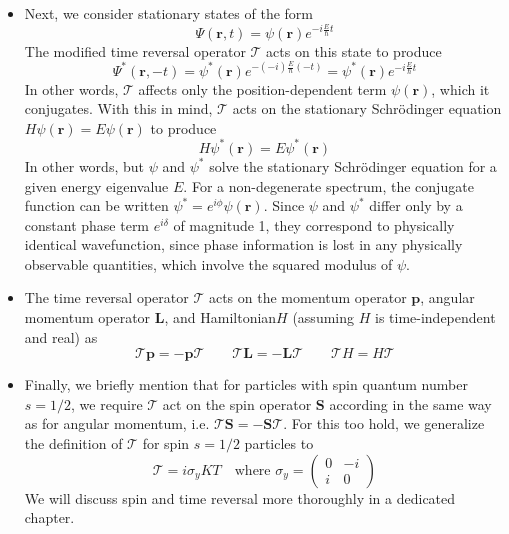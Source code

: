 \documentclass[11pt, a4paper]{article}
\newcommand{\Schro}{Schr\"{o}dinger\xspace}
\newcommand{\Ham}{Hamiltonian\xspace}
\renewcommand{\vec}[1]{\bm{#1}} %
\renewcommand{\r}{\vec{r}}  %
\newcommand{\T}{\mathcal{T}}  %
\newcommand{\p}{\psi}  %
\renewcommand{\P}{\Psi}  %
\begin{document}
\begin{itemize}
	\item Next, we consider stationary states of the form
	\begin{equation*}
		\P(\r, t) = \p(\r)e^{-i\frac{E}{\hbar}t}
	\end{equation*}
	The modified time reversal operator $ \T $ acts on this state to produce
	\begin{equation*}
		\P^{*}(\r, -t) = \p^{*}(\r)e^{-(-i)\frac{E}{\hbar}(-t)} = \p^{*}(\r)e^{-i\frac{E}{\hbar}t}
	\end{equation*}
	In other words, $ \T $ affects only the position-dependent term $ \p(\r) $, which it conjugates. With this in mind,	$ \T $ acts on the stationary \Schro equation $ H \p(\r) = E\p(\r) $ to produce
	\begin{equation*}
		 H \p^{*}(\r) = E\p^{*}(\r) 
	\end{equation*}
	In other words, but $ \p $ and $ \p^{*} $ solve the stationary \Schro equation for a given energy eigenvalue $ E $. For a non-degenerate spectrum, the conjugate function can be written $ \p^{*} = e^{i\phi}\p(\r) $. Since $ \p $ and $ \p^{*} $ differ only by a constant phase term $ e^{i\delta} $ of magnitude 1, they correspond to physically identical wavefunction, since phase information is lost in any physically observable quantities, which involve the squared modulus of $ \p $.
	
	\item The time reversal operator $ \T $ acts on the momentum operator $ \vec{p} $, angular momentum operator $ \vec{L} $, and \Ham $ H $ (assuming $ H $ is time-independent and real) as
	\begin{equation*}
		\T \vec{p} = - \vec{p} \T \qquad \T \vec{L} = - \vec{L} \T \qquad \T H = H \T
	\end{equation*}
	
	\item Finally, we briefly mention that for particles with spin quantum number $ s = 1/2 $, we require $ \T $ act on the spin operator $ \vec{S} $ according in the same way as for angular momentum, i.e. $ \T \vec{S} = - \vec{S} \T $. For this too hold, we generalize the definition of $ \T $ for spin $ s = 1/2 $ particles to
	\begin{equation*}
		\T = i \sigma_{y} K T \quad \text{where }  \sigma_{y} = 
		\begin{pmatrix}
			0 & - i\\
			i & 0
		\end{pmatrix}
	\end{equation*}
	We will discuss spin and time reversal more thoroughly in a dedicated chapter. 
	

\end{itemize}
\end{document}
